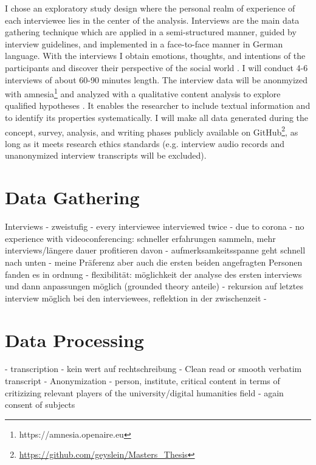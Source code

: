 \documentclass[12pt,a4paper,titlepage,oneside,abstract=true,toc=listof,toc=bibliography]{scrreprt}
\begin{document}
I chose an exploratory study design \citep{Rinsdorf2013} where the personal realm of experience of each interviewee lies in the center of the analysis. Interviews are the main data gathering technique which are applied in a semi-structured manner, guided by interview guidelines, and implemented in a face-to-face manner \citep{Bryman2004} in German language. With the interviews I obtain emotions, thoughts, and intentions of the participants and discover their perspective of the social world \citep{Patton2002}. I will conduct 4-6 interviews of about 60-90 minutes length. The interview data will be anonmyized with amnesia\footnote{https://amnesia.openaire.eu} and analyzed with a qualitative content analysis to explore qualified hypotheses \citep{Kohlbacher2006, Krippendorff2012, Mayring2000, Mayring2014}. It enables the researcher to include textual information and to identify its properties systematically. I will make all data generated during the concept, survey, analysis, and writing phases publicly available on GitHub\footnote{\url{https://github.com/geyslein/Masters_Thesis}}, as long as it meets research ethics standards (e.g. interview audio records and unanonymized interview transcripts will be excluded).

\section{Data Gathering}

Interviews - zweistufig
- every interviewee interviewed twice
- due to corona
- no experience with videoconferencing: schneller erfahrungen sammeln, mehr interviews/längere dauer profitieren davon
- aufmerksamkeitsspanne geht schnell nach unten
- meine Präferenz aber auch die ersten beiden angefragten Personen fanden es in ordnung
- flexibilität: möglichkeit der analyse des ersten interviews und dann anpassungen möglich (grounded theory anteile)
- rekursion auf letztes interview möglich bei den interviewees, reflektion in der zwischenzeit 
- 

\section{Data Processing}
- transcription \cite{Edwards2003}
	- kein wert auf rechtschreibung
	- Clean read or smooth verbatim transcript \citep[p. 45]{Mayring2014}
- Anonymization
	- person, institute, critical content in terms of critizizing relevant players of the university/digital humanities field
	- again consent of subjects
\end{document}
